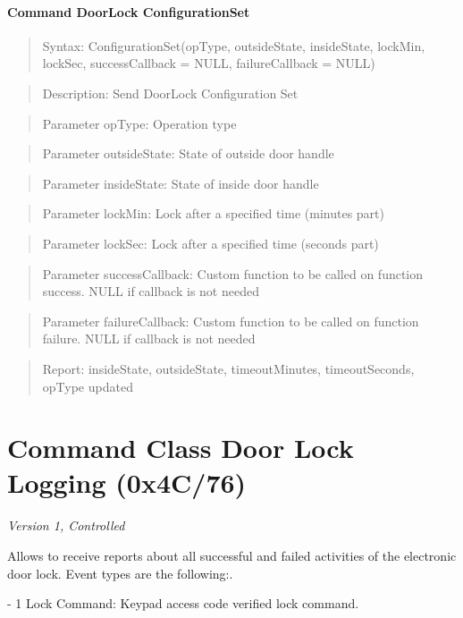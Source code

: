 \paragraph{Command DoorLock ConfigurationSet}
\begin{quote}Syntax: ConfigurationSet(opType, outsideState, insideState, lockMin, lockSec, successCallback = NULL, failureCallback = NULL)\end{quote}
\begin{quote}Description: Send DoorLock Configuration Set\end{quote}
\begin{quote}Parameter opType: Operation type\end{quote}
\begin{quote}Parameter outsideState: State of outside door handle\end{quote}
\begin{quote}Parameter insideState: State of inside door handle\end{quote}
\begin{quote}Parameter lockMin: Lock after a specified time (minutes part)\end{quote}
\begin{quote}Parameter lockSec: Lock after a specified time (seconds part)\end{quote}
\begin{quote}Parameter successCallback: Custom function to be called on function success. NULL if callback is not needed\end{quote}
\begin{quote}Parameter failureCallback: Custom function to be called on function failure. NULL if callback is not needed\end{quote}
\begin{quote}Report: insideState, outsideState, timeoutMinutes, timeoutSeconds, opType updated\end{quote}


\section{Command Class Door Lock Logging (0x4C/76)}

\textit{Version 1, Controlled}
\newline

Allows to receive reports about all successful and failed activities of the electronic door lock. Event types are the following:. 

- 1 Lock Command: Keypad access code verified lock command. 

